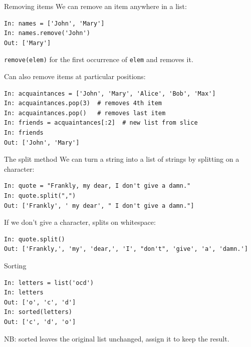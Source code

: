 \documentclass[aspectratio=169,usenames,dvipsnames]{beamer}
\begin{document}
\begin{frame}[fragile]{Removing items}
We can remove an item anywhere in a list:
\begin{lstlisting} 
In: names = ['John', 'Mary']
In: names.remove('John')
Out: ['Mary']
\end{lstlisting}

\texttt{remove(elem)}  for the first occurrence of
\texttt{elem} and removes it.

\pause
\vspace{1em}
Can also remove items at particular positions:
\begin{lstlisting} 
In: acquaintances = ['John', 'Mary', 'Alice', 'Bob', 'Max']
In: acquaintances.pop(3)  # removes 4th item
In: acquaintances.pop()   # removes last item
In: friends = acquaintances[:2]  # new list from slice
In: friends
Out: ['John', 'Mary']
\end{lstlisting}

\end{frame}


\begin{frame}[fragile]{The split method}
We can turn a string into a list of strings
by splitting on a character:
\begin{lstlisting} 
In: quote = "Frankly, my dear, I don't give a damn."
In: quote.split(",")
Out: ['Frankly', ' my dear', " I don't give a damn."]
\end{lstlisting}

\pause
If we don't give a character, splits on whitespace:
\begin{lstlisting} 
In: quote.split()
Out: ['Frankly,', 'my', 'dear,', 'I', "don't", 'give', 'a', 'damn.']
\end{lstlisting}
\end{frame}


\begin{frame}[fragile]{Sorting}
\begin{lstlisting} 
In: letters = list('ocd')
In: letters
Out: ['o', 'c', 'd']
In: sorted(letters)
Out: ['c', 'd', 'o']
\end{lstlisting}

NB: sorted leaves the original list unchanged,
assign it to keep the result.
\end{frame}
\end{document}
